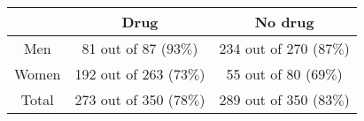 \documentclass[standalone, version=1.0]{huangfusl-template}
\begin{document}
    \begin{tabular}{ccc}
        \toprule
        & Drug & No drug \\
        \midrule
        Men & 81 out of 87 ($93\%$) & 234 out of 270 ($87\%$) \\
        Women & 192 out of 263 ($73\%$) & 55 out of 80 ($69\%$) \\
        Total & 273 out of 350 ($78\%$) & 289 out of 350 ($83\%$) \\
        \bottomrule
    \end{tabular}
\end{document}
